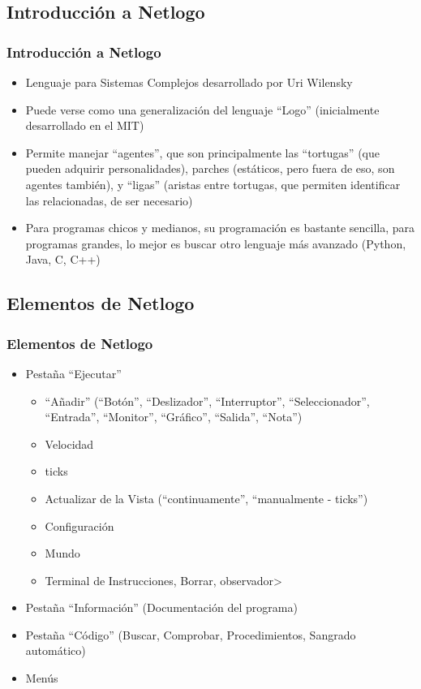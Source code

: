 \documentclass{beamer}
\begin{document}
\subsection{Introducción a Netlogo}
\begin{frame}[t]
\frametitle{Introducción a Netlogo}
\begin{itemize}[<+-| alert@+>]
	\item Lenguaje para Sistemas Complejos desarrollado por Uri Wilensky
	\item Puede verse como una generalización del lenguaje ``Logo'' (inicialmente desarrollado en el MIT)
	\item Permite manejar ``agentes'', que son principalmente las ``tortugas'' (que pueden adquirir personalidades), parches (estáticos, pero fuera de eso, son agentes también), y ``ligas'' (aristas entre tortugas, que permiten identificar las relacionadas, de ser necesario)
	\item Para programas chicos y medianos, su programación es bastante sencilla, para programas grandes, lo mejor es buscar otro lenguaje más avanzado (Python, Java, C, C++)
\end{itemize}

\end{frame}

\subsection{Elementos de Netlogo}
\begin{frame}[t]
\frametitle{Elementos de Netlogo}
\begin{itemize}[<+-| alert@+>]
	\item Pestaña ``Ejecutar''
	\begin{itemize}[<+->]
	\item ``Añadir'' (``Botón'', ``Deslizador'', ``Interruptor'', ``Seleccionador'', ``Entrada'', ``Monitor'', ``Gráfico'', ``Salida'', ``Nota'')
	\item Velocidad
	\item ticks
	\item Actualizar de la Vista (``continuamente'', ``manualmente - ticks'')
	\item Configuración
	\item Mundo
	\item Terminal de Instrucciones, Borrar, observador>
	\end{itemize}
	\item Pestaña ``Información'' (Documentación del programa)
	\item Pestaña ``Código'' (Buscar, Comprobar, Procedimientos, Sangrado automático)
	\item Menús
\end{itemize}
\end{frame}
\end{document}
